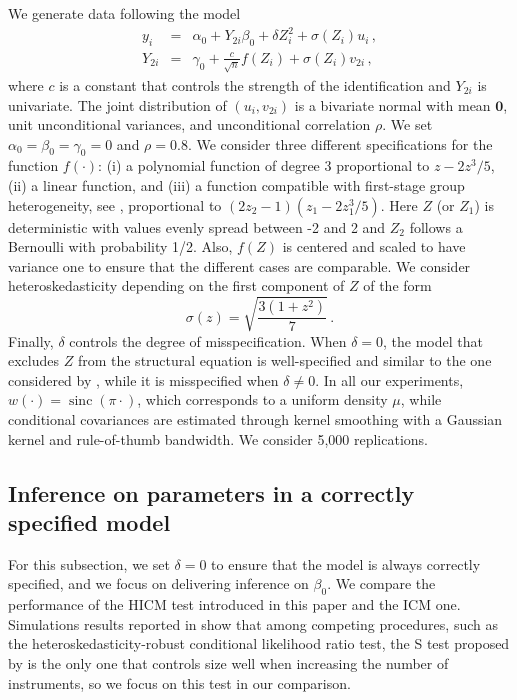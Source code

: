 \documentclass[12pt]{article}
\newcommand{\1}{\mathbf{1}}
\begin{document}
We generate data following the model
\begin{eqnarray}
y_i &=& \alpha_0 + Y_{2i}\beta_0 + \delta Z_i^2 + \sigma(Z_i) u_{i} \, ,\label{eq:sim} \\
Y_{2i} &=& \gamma_0 + \frac{c}{\sqrt{n}} f(Z_i) + \sigma(Z_i) v_{2i} \, , \nonumber
\end{eqnarray}
where $c$ is a constant that controls the strength of the
identification and $Y_{2i}$ is univariate.  The joint distribution of
$(u_{i},v_{2i})$ is a bivariate normal with mean $\mathbf{0}$, unit
unconditional variances, and unconditional correlation $\rho$. We set
$\alpha_0=\beta_0=\gamma_0=0$ and $\rho=0.8$.  We consider three
different specifications for the function $f(\cdot)$: (i) a polynomial
function of degree 3 proportional to $z- 2z^3/5$, (ii) a linear
function, and (iii) a function compatible with first-stage group heterogeneity,
see \cite{Abadie2024}, proportional to $\left( 2 z_2 - 1\right) \left( z_1-2z_1^3/5
\right)$. Here $Z$ (or $Z_1$) is deterministic with values
evenly spread between -2 and 2 and $Z_{2}$ follows a Bernoulli with
probability 1/2. Also, $f(Z)$ is centered and scaled to have variance
one to ensure that the different cases are comparable.  We consider
heteroskedasticity depending on the first component of $Z$ of the form
\[
\sigma(z)= \sqrt{\frac{3(1+z^2)}{7}} \, .
\]
Finally, $\delta$ controls the degree of misspecification. When
$\delta = 0$, the model that excludes $Z$ from the structural equation
is well-specified and  similar to the one considered by
\cite{antoine_identification-robust_2023}, while it is misspecified
when $\delta \neq 0$.
In all our experiments, $w(\cdot) = \operatorname{sinc}(\pi \cdot)$, which
corresponds to a uniform density $\mu$, while conditional covariances
are estimated through kernel smoothing
with a Gaussian kernel and rule-of-thumb bandwidth. We consider 5,000
replications.


\subsection{Inference on parameters in a correctly specified model}
\label{subsec:sim idr inference}

For this subsection, we set $\delta=0$ to ensure that the model is
always correctly specified, and we focus on delivering inference on
$\beta_0$. We compare the performance of the HICM test introduced in
this paper and the ICM one.  Simulations results reported in
\cite{antoine_identification-robust_2023} show that among competing
procedures, such as the heteroskedasticity-robust conditional likelihood ratio test, the
S test proposed by \cite{SW} is the only one that controls size well
when increasing the number of instruments, so we focus on this test
in our comparison.
\end{document}

